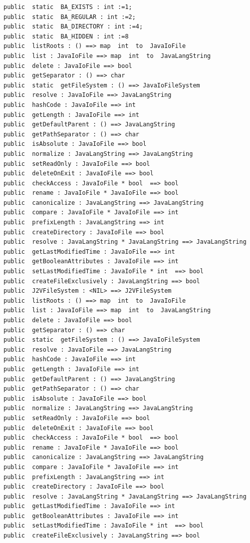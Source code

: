 \documentclass[\pformat,12pt]{jarticle}
\begin{document}
\begin{small}
\begin{verbatim}
public  static  BA_EXISTS : int :=1;
public  static  BA_REGULAR : int :=2;
public  static  BA_DIRECTORY : int :=4;
public  static  BA_HIDDEN : int :=8
public  listRoots : () ==> map  int  to  JavaIoFile
public  list : JavaIoFile ==> map  int  to  JavaLangString
public  delete : JavaIoFile ==> bool
public  getSeparator : () ==> char
public  static  getFileSystem : () ==> JavaIoFileSystem
public  resolve : JavaIoFile ==> JavaLangString
public  hashCode : JavaIoFile ==> int
public  getLength : JavaIoFile ==> int
public  getDefaultParent : () ==> JavaLangString
public  getPathSeparator : () ==> char
public  isAbsolute : JavaIoFile ==> bool
public  normalize : JavaLangString ==> JavaLangString
public  setReadOnly : JavaIoFile ==> bool
public  deleteOnExit : JavaIoFile ==> bool
public  checkAccess : JavaIoFile * bool  ==> bool
public  rename : JavaIoFile * JavaIoFile ==> bool
public  canonicalize : JavaLangString ==> JavaLangString
public  compare : JavaIoFile * JavaIoFile ==> int
public  prefixLength : JavaLangString ==> int
public  createDirectory : JavaIoFile ==> bool
public  resolve : JavaLangString * JavaLangString ==> JavaLangString
public  getLastModifiedTime : JavaIoFile ==> int
public  getBooleanAttributes : JavaIoFile ==> int
public  setLastModifiedTime : JavaIoFile * int  ==> bool
public  createFileExclusively : JavaLangString ==> bool
public  J2VFileSystem : <NIL> ==> J2VFileSystem
public  listRoots : () ==> map  int  to  JavaIoFile
public  list : JavaIoFile ==> map  int  to  JavaLangString
public  delete : JavaIoFile ==> bool
public  getSeparator : () ==> char
public  static  getFileSystem : () ==> JavaIoFileSystem
public  resolve : JavaIoFile ==> JavaLangString
public  hashCode : JavaIoFile ==> int
public  getLength : JavaIoFile ==> int
public  getDefaultParent : () ==> JavaLangString
public  getPathSeparator : () ==> char
public  isAbsolute : JavaIoFile ==> bool
public  normalize : JavaLangString ==> JavaLangString
public  setReadOnly : JavaIoFile ==> bool
public  deleteOnExit : JavaIoFile ==> bool
public  checkAccess : JavaIoFile * bool  ==> bool
public  rename : JavaIoFile * JavaIoFile ==> bool
public  canonicalize : JavaLangString ==> JavaLangString
public  compare : JavaIoFile * JavaIoFile ==> int
public  prefixLength : JavaLangString ==> int
public  createDirectory : JavaIoFile ==> bool
public  resolve : JavaLangString * JavaLangString ==> JavaLangString
public  getLastModifiedTime : JavaIoFile ==> int
public  getBooleanAttributes : JavaIoFile ==> int
public  setLastModifiedTime : JavaIoFile * int  ==> bool
public  createFileExclusively : JavaLangString ==> bool
\end{verbatim}
\end{small}
\end{document}
